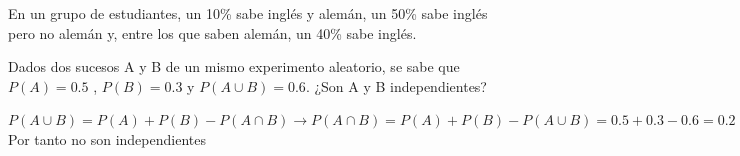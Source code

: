 \documentclass[addpoints,spanish, 12pt,a4paper]{exam}
\begin{document}
\begin{questions}
\question En un grupo de estudiantes, un 10\% sabe inglés y alemán, un 50\% sabe inglés pero no alemán y, entre los que saben alemán, un 40\% sabe inglés.

\question[2] Dados dos sucesos A y B de un mismo experimento aleatorio, se sabe que 
  $P(A)=0.5$ , $P(B)=0.3$ y $P(A\cup B)=0.6$. 
  ¿Son A y B independientes?
  \begin{solution}
  $P(A\cup B)=P(A)+P(B)-P(A\cap B) 
  \to P(A\cap B)=P(A)+P(B)-P(A\cup B)=0.5+0.3-0.6=0.2\neq 0.15=0.5 \cdot 0.3=P(A) \cdot P(B)$ \\
  Por tanto no son independientes  
  \end{solution}


\end{questions}
\end{document}
